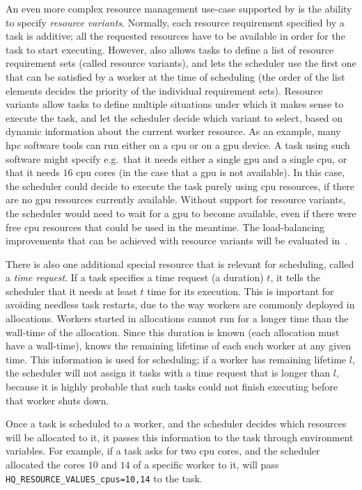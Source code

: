 An even more complex resource management use-case supported by \hyperqueue{} is the
ability to specify \emph{resource variants}. Normally, each resource requirement specified by a task
is additive; all the requested resources have to be available in order for the task to start
executing. However, \hq{} also allows tasks to define a list of resource
requirement sets (called resource variants), and lets the scheduler use the first one that can be
satisfied by a worker at the time of scheduling (the order of the list elements decides the
priority of the individual requirement sets). Resource variants allow tasks to define multiple
situations under which it makes sense to execute the task, and let the scheduler decide which
variant to select, based on dynamic information about the current worker resource. As an example,
many \gls{hpc} software tools can run either on a \gls{cpu} or on a
\gls{gpu} device. A task using such software might specify e.g.\ that it needs either
a single \gls{gpu} and a single \gls{cpu}, or that it needs
$16$ \gls{cpu} cores (in the case that a \gls{gpu} is
not available). In this case, the scheduler could decide to execute the task purely using
\gls{cpu} resources, if there are no \gls{gpu} resources currently
available. Without support for resource variants, the scheduler would need to wait for a
\gls{gpu} to become available, even if there were free \gls{cpu}
resources that could be used in the meantime. The load-balancing improvements that can be achieved
with resource variants will be evaluated in~.

There is also one additional special resource that is relevant for scheduling, called a
\emph{time request}. If a task specifies a time request (a duration) $t$, it
tells the scheduler that it needs at least $t$ time for its execution. This is
important for avoiding needless task restarts, due to the way \hq{} workers are
commonly deployed in allocations. Workers started in allocations cannot run for a longer time than
the wall-time of the allocation. Since this duration is known (each allocation must have a
wall-time), \hq{} knows the remaining lifetime of each such worker at any given
time. This information is used for scheduling; if a worker has remaining lifetime
$l$, the scheduler will not assign it tasks with a time request that is longer
than $l$, because it is highly probable that such tasks could not finish
executing before that worker shuts down.

Once a task is scheduled to a worker, and the scheduler decides which resources will be allocated
to it, it passes this information to the task through environment variables. For example, if a task
asks for two \gls{cpu} cores, and the scheduler allocated the cores
$10$ and $14$ of a specific worker to it,
\hq{} will pass \texttt{HQ\_RESOURCE\_VALUES\_cpus=10,14} to the task.

